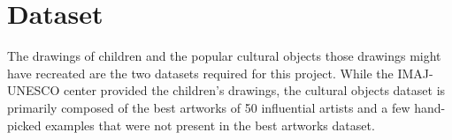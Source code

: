 \section{Dataset}\label{chap:4:sec:dataset}

The drawings of children and the popular cultural objects those drawings might have recreated are the two datasets required for this project. While the IMAJ-UNESCO center provided the children's drawings, the cultural objects dataset is primarily composed of the best artworks of 50 influential artists and a few hand-picked examples that were not present in the best artworks dataset.

 

